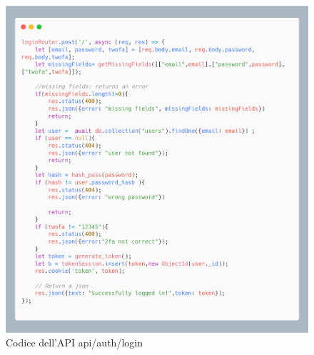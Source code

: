\documentclass{report}
\begin{document}
\begin{figure}[H]
	\centering\includegraphics[width=1\textwidth]{images/microservizio-autenticazione/login-carbon.png}
	Codice dell'API api/auth/login
\end{figure}
\end{document}
